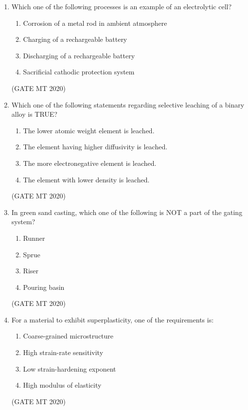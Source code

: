 \documentclass[journal, 11pt, onecolumn]{IEEEtran}
\theoremstyle{remark}
\begin{document}
\begin{enumerate}
\item Which one of the following processes is an example of an electrolytic cell?  
\begin{enumerate}
\item Corrosion of a metal rod in ambient atmosphere  
\item Charging of a rechargeable battery  
\item Discharging of a rechargeable battery  
\item Sacrificial cathodic protection system  
\end{enumerate}
\hfill(GATE MT 2020)

\item Which one of the following statements regarding selective leaching of a binary alloy is TRUE?  

\begin{multicols}{2}
\begin{enumerate}
\item The lower atomic weight element is leached.  
\item The element having higher diffusivity is leached.  
\item The more electronegative element is leached.  
\item The element with lower density is leached.  
\end{enumerate}
\end{multicols}
\hfill(GATE MT 2020)

\item In green sand casting, which one of the following is NOT a part of the gating system?  

\begin{multicols}{2}
\begin{enumerate}
\item Runner  
\item Sprue  
\item Riser  
\item Pouring basin  
\end{enumerate}
\end{multicols}
\hfill(GATE MT 2020)

\item For a material to exhibit superplasticity, one of the requirements is:  

\begin{multicols}{2}
\begin{enumerate}
\item Coarse-grained microstructure  
\item High strain-rate sensitivity  
\item Low strain-hardening exponent  
\item High modulus of elasticity  
\end{enumerate}
\end{multicols}
\hfill(GATE MT 2020)


\end{enumerate}
\end{document}
